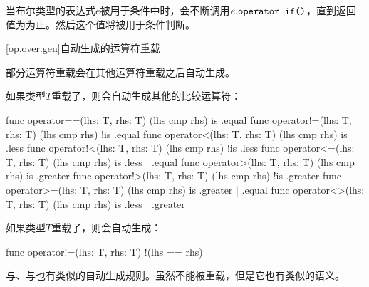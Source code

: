 \pnum
当布尔类型的表达式$e$被用于条件中时，会不断调用$e.\texttt{operator if()}$，直到返回值为为止。然后这个值将被用于条件判断。

[op.over.gen]{自动生成的运算符重载}

\pnum
部分运算符重载会在其他运算符重载之后自动生成。

\pnum
如果类型$T$重载了，则会自动生成其他的比较运算符：

\begin{codeblock}
func operator==(lhs: T, rhs: T) { (lhs cmp rhs) is .equal }
func operator!=(lhs: T, rhs: T) { (lhs cmp rhs) !is .equal }
func operator<(lhs: T, rhs: T) { (lhs cmp rhs) is .less }
func operator!<(lhs: T, rhs: T) { (lhs cmp rhs) !is .less }
func operator<=(lhs: T, rhs: T) { (lhs cmp rhs) is .less | .equal }
func operator>(lhs: T, rhs: T) { (lhs cmp rhs) is .greater }
func operator!>(lhs: T, rhs: T) { (lhs cmp rhs) !is .greater }
func operator>=(lhs: T, rhs: T) { (lhs cmp rhs) is .greater | .equal }
func operator<>(lhs: T, rhs: T) { (lhs cmp rhs) is .less | .greater }
\end{codeblock}

\pnum
如果类型$T$重载了，则会自动生成：

\begin{codeblock}
func operator!=(lhs: T, rhs: T) { !(lhs == rhs) }
\end{codeblock}

与、与也有类似的自动生成规则。\enternote 虽然不能被重载，但是它也有类似的语义。\exitnote